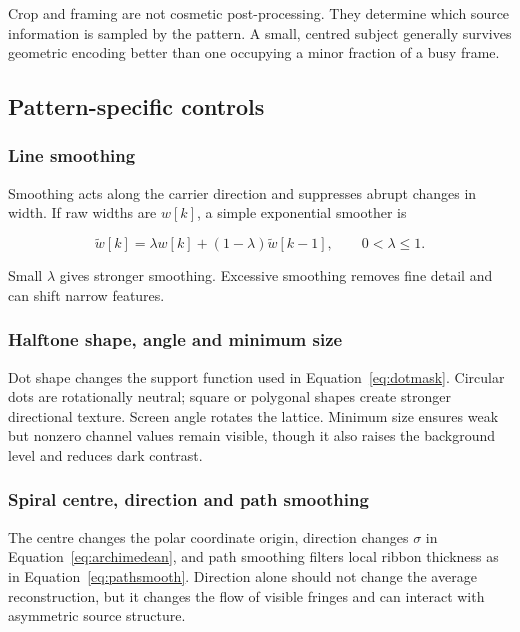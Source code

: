 Crop and framing are not cosmetic post-processing. They determine which source information is sampled by the pattern. A small, centred subject generally survives geometric encoding better than one occupying a minor fraction of a busy frame.

\subsection{Pattern-specific controls}

\subsubsection{Line smoothing}

Smoothing acts along the carrier direction and suppresses abrupt changes in width. If raw widths are $w[k]$, a simple exponential smoother is

\begin{equation}
\widetilde{w}[k]=\lambda w[k]+(1-\lambda)\widetilde{w}[k-1],
\qquad 0<\lambda\le1.
\label{eq:expsmooth}
\end{equation}

Small $\lambda$ gives stronger smoothing. Excessive smoothing removes fine detail and can shift narrow features.

\subsubsection{Halftone shape, angle and minimum size}

Dot shape changes the support function used in Equation~\eqref{eq:dotmask}. Circular dots are rotationally neutral; square or polygonal shapes create stronger directional texture. Screen angle rotates the lattice. Minimum size ensures weak but nonzero channel values remain visible, though it also raises the background level and reduces dark contrast.

\subsubsection{Spiral centre, direction and path smoothing}

The centre changes the polar coordinate origin, direction changes $\sigma$ in Equation~\eqref{eq:archimedean}, and path smoothing filters local ribbon thickness as in Equation~\eqref{eq:pathsmooth}. Direction alone should not change the average reconstruction, but it changes the flow of visible fringes and can interact with asymmetric source structure.

\clearpage
